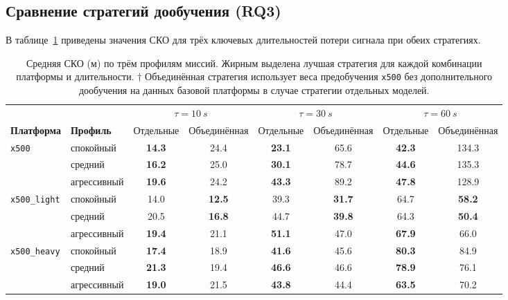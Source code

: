 \subsection{Сравнение стратегий дообучения (RQ3)}
\label{subsec:mp_rq3}

В таблице~\ref{tab:strategy_comparison} приведены значения СКО для трёх ключевых длительностей потери сигнала при обеих стратегиях.

\begin{table}[htbp]
	\centering
	\caption{Средняя СКО (м) по трём профилям миссий.
		Жирным выделена лучшая стратегия для каждой комбинации платформы и длительности.
		$\dagger$ Объединённая стратегия использует веса предобучения \texttt{x500} без дополнительного дообучения на данных базовой платформы в случае стратегии отдельных моделей.}
	\label{tab:strategy_comparison}
	\setlength{\tabcolsep}{5pt}
	\begin{tabular}{ll*{6}{c}}
		\toprule
		& & \multicolumn{2}{c}{$\tau=\SI{10}{s}$} &
		\multicolumn{2}{c}{$\tau=\SI{30}{s}$} &
		\multicolumn{2}{c}{$\tau=\SI{60}{s}$} \\
		\cmidrule(lr){3-4}\cmidrule(lr){5-6}\cmidrule(lr){7-8}
		\textbf{Платформа} & \textbf{Профиль} &
		Отдельные & Объединённая & Отдельные & Объединённая & Отдельные & Объединённая \\
		\midrule
		\multirow{3}{*}{\texttt{x500}}
		& спокойный   & \textbf{14.3} & 24.4 & \textbf{23.1} & 65.6  & \textbf{42.3} & 134.3 \\
		& средний     & \textbf{16.2} & 25.0 & \textbf{30.1} & 78.7  & \textbf{44.6} & 135.3 \\
		& агрессивный & \textbf{19.6} & 24.2 & \textbf{43.3} & 89.2  & \textbf{47.8} & 128.9 \\
		\midrule
		\multirow{3}{*}{\texttt{x500\_light}}
		& спокойный   & 14.0 & \textbf{12.5} & 39.3 & \textbf{31.7} & 64.7 & \textbf{58.2} \\
		& средний     & 20.5 & \textbf{16.8} & 44.7 & \textbf{39.8} & 64.3 & \textbf{50.4} \\
		& агрессивный & \textbf{19.4} & 21.1 & \textbf{51.1} & 47.0  & \textbf{67.9} & 66.0  \\
		\midrule
		\multirow{3}{*}{\texttt{x500\_heavy}}
		& спокойный   & \textbf{17.4} & 18.9 & \textbf{41.6} & 45.6  & \textbf{80.3} & 84.9  \\
		& средний     & \textbf{21.3} & 19.4 & \textbf{46.6} & 46.6  & \textbf{78.9} & 76.1  \\
		& агрессивный & \textbf{19.0} & 21.5 & \textbf{43.8} & 44.4  & \textbf{63.5} & 70.2  \\
		\bottomrule
	\end{tabular}
\end{table}

